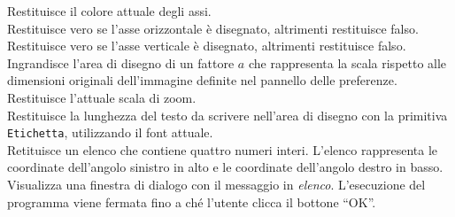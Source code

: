  Restituisce il colore attuale degli assi.\\
 Restituisce vero se l'asse orizzontale è disegnato, altrimenti restituisce falso.\\
 Restituisce vero se l'asse verticale è disegnato, altrimenti restituisce falso.\\
 Ingrandisce l'area di disegno di un fattore $a$ che rappresenta la scala rispetto alle dimensioni originali dell'immagine definite nel pannello delle preferenze.\\
 Restituisce l'attuale scala di zoom.\\
 Restituisce la lunghezza del testo da scrivere nell'area di disegno con la primitiva \texttt{Etichetta}, utilizzando il font attuale. \\
 Retituisce un elenco che contiene quattro numeri interi. L'elenco rappresenta le coordinate dell'angolo sinistro in alto e le coordinate dell'angolo destro in basso.\\
 Visualizza una finestra di dialogo con il messaggio in \textit{elenco}. L'esecuzione del programma viene fermata fino a ché l'utente clicca il bottone ``OK''.\\
